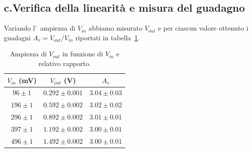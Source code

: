 \documentclass[10pt,a4paper]{article}
\begin{document}
\subsection*{c.Verifica della linearit\`a e misura del guadagno}
Variando l'~ampiezza di $V_{in}$ abbiamo misurato $V_{out}$ e per ciascun valore ottenuto i guadagni $A_v=V_{out}/V_{in}
$ riportati in tabella~\ref{tab:guadagno}.
%
\begin{table}[h]
\caption{Ampiezza di $V_{out}$ in funzione di $V_{in}$ e relativo rapporto.}
\label{tab:guadagno}
\begin{center}
\begin{tabular}{|c|c|c|}
\hline
$V_{in}$ (mV) & $V_{out}$ (V)  & $A_v$ \\
\hline
\hline
$96 \pm 1 $ & $0.292 \pm 0.001 $ & $3.04 \pm 0.03$ \\
\hline
$196 \pm 1 $ & $0.592 \pm 0.002 $ & $3.02 \pm 0.02 $ \\
\hline
$296 \pm 1 $ & $0.892 \pm 0.002 $ & $3.01 \pm 0.01 $ \\
\hline
$397 \pm 1 $ & $1.192 \pm 0.002 $ & $3.00 \pm 0.01 $ \\
\hline
$496 \pm 1 $ & $1.492 \pm 0.002 $ & $3.00 \pm 0.01 $ \\
\hline
\end{tabular}
\end{center}
\end{table}
\end{document}
